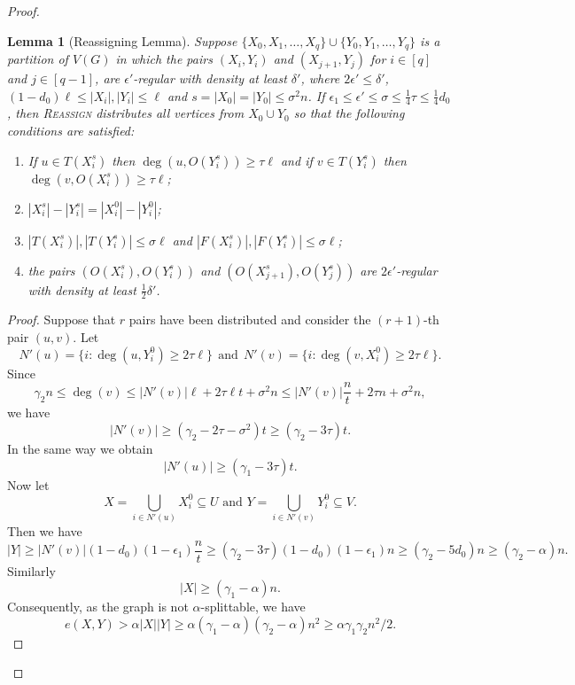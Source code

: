 \documentclass[oneside,12pt]{memoir}
\newtheorem{lemma}[theorem]{Lemma}
\newcommand{\ep}{\epsilon}
\newcommand{\g}{\gamma}
\newcommand{\half}{\frac{1}{2}}
\begin{document}
\begin{proof}
\begin{lemma}[Reassigning Lemma]\label{reassignlem}
Suppose $\{X_0, X_1,\dots, X_q\}\cup \{Y_0, Y_1,\dots, Y_q\}$ is a partition of $V(G)$ in which the pairs $(X_i,Y_i)$ and $(X_{j+1},Y_j)$ 
for $i\in[q]$ and $j\in[q-1]$, 
are $\ep'$-regular with density at least $\delta'$, where $2\ep'\leq\delta'$, 
$(1-d_0)\ell \leq |X_i|,|Y_i|\leq \ell$ and $s=|X_0|=|Y_0|\leq \sigma^2 n$.  
If $\ep_1 \le \ep' \leq \sigma \leq \frac{1}{4}\tau\leq \frac{1}{4}d_0$,
then \textsc{Reassign} distributes all vertices from $X_0 \cup Y_0$ so that the following conditions are satisfied:

\begin{enumerate}
\item If $u\in T(X_i^s)$ then $\deg(u, O(Y_i^s)) \geq \tau \ell$ and if $v\in T(Y_i^s)$ then
$\deg(v, O(X_i^s)) \geq \tau \ell$;
\item $|X_i^s|-|Y_i^s|=|X_i^0|-|Y_i^0|$;
\item $|T(X_i^s)|,|T(Y_i^s)|\leq \sigma \ell$ and $|F(X_i^s)|,|F(Y_i^s)|\leq \sigma \ell$;
\item the pairs $(O(X_i^s),O(Y_i^s))$ and $(O(X_{j+1}^s), O(Y_j^s))$ are $2\ep'$-regular with density at least $\half \delta'$.
\end{enumerate}

\end{lemma}



\begin{proof} 

Suppose that $r$ pairs have been distributed and consider the $(r+1)$-th pair $(u,v)$. Let
$$N'(u) = \{i: \deg(u,Y_i^0) \geq 2 \tau \ell\}~~\text{and}~~ N'(v)= \{i: \deg(v,X_i^0) \geq 2 \tau \ell\}.$$
Since
$$\g_2 n \leq \deg(v) \leq |N'(v)|\ell + 2\tau \ell t +\sigma^2 n\le |N'(v)|\frac{n}{t} + 2\tau n +\sigma^2 n,$$
we have
$$|N'(v)| \geq (\g_2-2\tau-\sigma^2)t \geq (\g_2 - 3\tau)t.$$
In the same way we obtain $$|N'(u)|\geq (\g_1 -3\tau)t.$$ Now let 
$$X=\bigcup_{i \in N'(u)} X_i^0 \subseteq U \mbox{ and } Y = \bigcup_{i \in N'(v)} Y_i^0 \subseteq V.$$
Then we have
$$|Y|\geq |N'(v)|(1-d_0)(1 -\ep_1)\frac{n}{t} \geq (\g_2 -3\tau)(1-d_0)(1- \ep_1) n\geq (\g_2-5d_0)n \geq(\g_2-\alpha)n.$$
Similarly
$$|X| \geq (\g_1 - \alpha)n.$$
Consequently, as the graph is not $\alpha$-splittable, we have 
\begin{equation}
e(X,Y) > \alpha |X||Y| \geq \alpha(\g_1-\alpha)(\g_2-\alpha)n^2 \ge \alpha \g_1\g_2 n^2/2.
\label{rsplit}
\end{equation}


\end{proof}
\end{proof}
\end{document}

